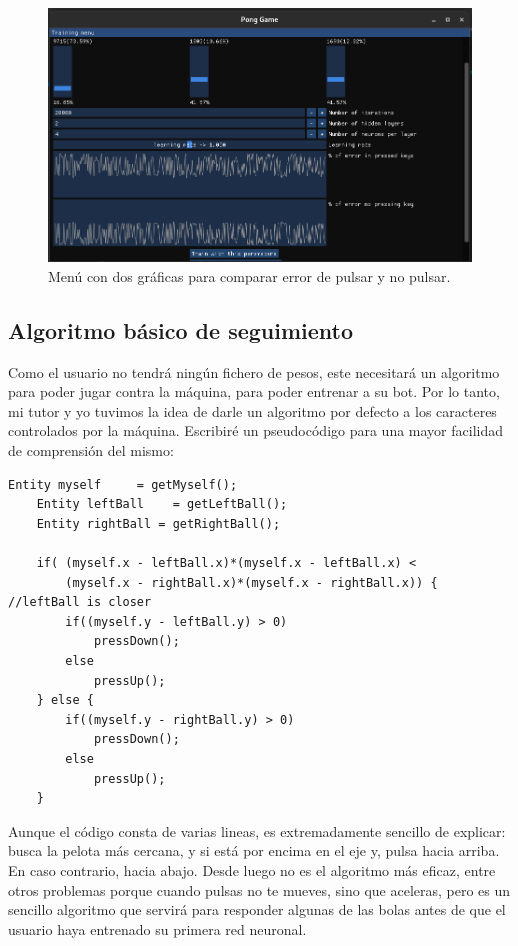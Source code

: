 \begin{figure}[H]
	\centering
	\includegraphics[width=15cm]{archivos/imagenes/menu-de-entrenamiento-dos-graficas.png}
	\caption{Menú con dos gráficas para comparar error de pulsar y no pulsar.}
	\label{menu dos graficas}
\end{figure}

\subsection{Algoritmo básico de seguimiento}
Como el usuario no tendrá ningún fichero de pesos, este necesitará un algoritmo para poder jugar contra la máquina, para poder entrenar a su bot. Por lo tanto, mi tutor y yo tuvimos la idea de darle un algoritmo por defecto a los caracteres controlados por la máquina. Escribiré un pseudocódigo para una mayor facilidad de comprensión del mismo:
\begin{lstlisting}[style=C-color, caption={Pseudocódigo de algoritmo de IA diseñada},label=macro-compile]
	Entity myself     = getMyself();
	Entity leftBall    = getLeftBall();
	Entity rightBall = getRightBall();
	
	if( (myself.x - leftBall.x)*(myself.x - leftBall.x) < 
		(myself.x - rightBall.x)*(myself.x - rightBall.x)) { //leftBall is closer
		if((myself.y - leftBall.y) > 0)
			pressDown();
		else
			pressUp();
	} else {
		if((myself.y - rightBall.y) > 0)
			pressDown();
		else
			pressUp();
	}
\end{lstlisting}
Aunque el código consta de varias lineas, es extremadamente sencillo de explicar: busca la pelota más cercana, y si está por encima en el eje y, pulsa hacia arriba. En caso contrario, hacia abajo. Desde luego no es el algoritmo más eficaz, entre otros problemas porque cuando pulsas no te mueves, sino que aceleras, pero es un sencillo algoritmo que servirá para responder algunas de las bolas antes de que el usuario haya entrenado su primera red neuronal.
 
